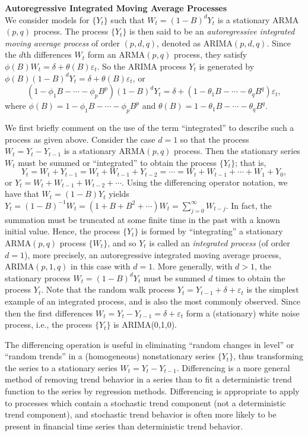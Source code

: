 \noindent\textbf{Autoregressive Integrated Moving Average Processes} \\


We consider models for $\{Y_t\}$ such that $W_t = (1 - B)^d Y_t$ is a stationary ARMA$(p,q)$ process. The process $\{Y_t\}$ is then said to be an \textit{autoregressive integrated moving average process} of order $(p,d,q)$, denoted as ARIMA$(p,d,q)$. Since the $d$th differences $W_t$ form an ARMA$(p,q)$ process, they satisfy $\phi(B)W_t = \delta + \theta(B)\varepsilon_t$. So the ARIMA process $Y_t$ is generated by $\phi(B)(1 - B)^dY_t = \delta + \theta(B)\varepsilon_t$, or
	\begin{equation}\label{eqn:b}
	(1 - \phi_1B - \cdots - \phi_pB^p)(1 - B)^dY_t = \delta + (1 - \theta_1B - \cdots - \theta_qB^q)\varepsilon_t,
	\end{equation}
where $\phi(B) = 1 - \phi_1B - \cdots - \phi_pB^p$ and $\theta(B) = 1 - \theta_1B - \cdots - \theta_qB^q$.


We first briefly comment on the use of the term ``integrated'' to describe such a process as given above. Consider the case $d=1$ so that the process $W_t = Y_t - Y_{t-1}$ is a stationary ARMA$(p,q)$ process. Then the stationary series $W_t$ must be summed or ``integrated'' to obtain the process $\{Y_t\}$; that is,
	\[
	Y_t = W_t + Y_{t-1} = W_t + W_{t-1} + Y_{t-2} = \cdots = W_t + W_{t-1} + \cdots + W_1 + Y_0,
	\]
or $Y_t = W_t + W_{t-1} + W_{t-2} + \cdots$. Using the differencing operator notation, we have that $W_t = (1 - B)Y_t$ yields $Y_t = (1 - B)^{-1}W_t = (1 + B + B^2 + \cdots)W_t = \sum_{j=0}^\infty W_{t-j}$. In fact, the summation must be truncated at some finite time in the past with a known initial value. Hence, the process $\{Y_t\}$ is formed by ``integrating'' a stationary ARMA$(p,q)$ process $\{W_t\}$, and so $Y_t$ is called an \textit{integrated process} (of order $d=1$), more precisely, an autoregressive integrated moving average process, ARIMA$(p,1,q)$ in this case with $d=1$. More generally, with $d>1$, the stationary process $W_t = (1 - B)^dY_t$ must be summed $d$ times to obtain the process $Y_t$. Note that the random walk process $Y_t = Y_{t-1} + \delta + \varepsilon_t$ is the simplest example of an integrated process, and is also the most commonly observed. Since then the first differences $W_t = Y_t - Y_{t-1} = \delta + \varepsilon_t$ form a (stationary) white noise process, i.e., the process $\{Y_t\}$ is ARIMA(0,1,0).


The differencing operation is useful in eliminating ``random changes in level'' or ``random trends'' in a (homogeneous) nonstationary series $\{Y_t\}$, thus transforming the series to a stationary series $W_t = Y_t - Y_{t-1}$. Differencing is a more general method of removing trend behavior in a series than to fit a deterministic trend function to the series by regression methods. Differencing is appropriate to apply to processes which contain a stochastic trend component (not a deterministic trend component), and stochastic trend behavior is often more likely to be present in financial time series than deterministic trend behavior.


